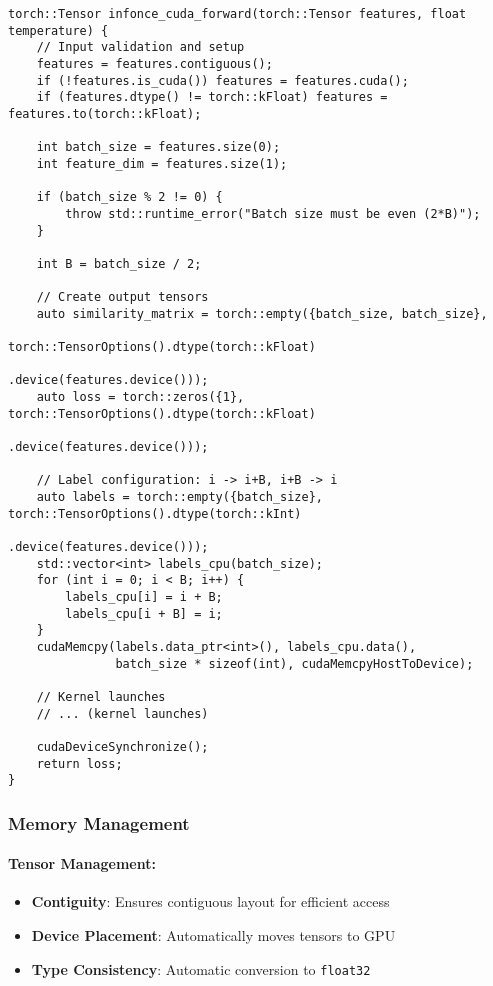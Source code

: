 \documentclass[a4paper,11pt]{article}
\begin{document}
\begin{lstlisting}[caption={C++ forward function}]
torch::Tensor infonce_cuda_forward(torch::Tensor features, float temperature) {
    // Input validation and setup
    features = features.contiguous();
    if (!features.is_cuda()) features = features.cuda();
    if (features.dtype() != torch::kFloat) features = features.to(torch::kFloat);
    
    int batch_size = features.size(0);
    int feature_dim = features.size(1);
    
    if (batch_size % 2 != 0) {
        throw std::runtime_error("Batch size must be even (2*B)");
    }
    
    int B = batch_size / 2;
    
    // Create output tensors
    auto similarity_matrix = torch::empty({batch_size, batch_size}, 
                                        torch::TensorOptions().dtype(torch::kFloat)
                                                              .device(features.device()));
    auto loss = torch::zeros({1}, torch::TensorOptions().dtype(torch::kFloat)
                                                        .device(features.device()));
    
    // Label configuration: i -> i+B, i+B -> i
    auto labels = torch::empty({batch_size}, torch::TensorOptions().dtype(torch::kInt)
                                                                   .device(features.device()));
    std::vector<int> labels_cpu(batch_size);
    for (int i = 0; i < B; i++) {
        labels_cpu[i] = i + B;
        labels_cpu[i + B] = i;
    }
    cudaMemcpy(labels.data_ptr<int>(), labels_cpu.data(), 
               batch_size * sizeof(int), cudaMemcpyHostToDevice);
    
    // Kernel launches
    // ... (kernel launches)
    
    cudaDeviceSynchronize();
    return loss;
}
\end{lstlisting}

\subsubsection{Memory Management}

\paragraph{Tensor Management:}
\begin{itemize}
    \item \textbf{Contiguity}: Ensures contiguous layout for efficient access
    \item \textbf{Device Placement}: Automatically moves tensors to GPU
    \item \textbf{Type Consistency}: Automatic conversion to \texttt{float32}
\end{itemize}
\end{document}
